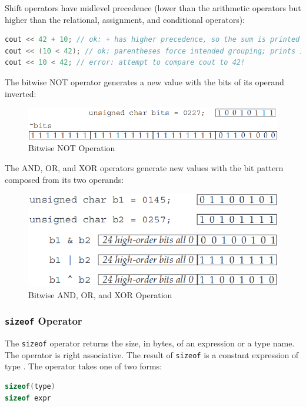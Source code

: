 Shift operators have midlevel precedence (lower than the arithmetic operators but higher than the relational, assignment, and conditional operators):
\begin{lstlisting}[language=C++]
cout << 42 + 10; // ok: + has higher precedence, so the sum is printed 
cout << (10 < 42); // ok: parentheses force intended grouping; prints 1  
cout << 10 < 42; // error: attempt to compare cout to 42!
\end{lstlisting}

The bitwise NOT operator generates a new value with the bits of its operand inverted:
\begin{figure}[H]
    \centering
    \includegraphics[width=.85\linewidth]{entries/2023/12/05/bitnot.png}
    \caption{Bitwise NOT Operation}
    \label{fig:bitnot}
\end{figure}

The AND, OR, and XOR operators generate new values with the bit pattern composed from its two operands:
\begin{figure}[H]
    \centering
    \includegraphics[width=.75\linewidth]{entries/2023/12/05/bitoth.png}
    \caption{Bitwise AND, OR, and XOR Operation}
    \label{fig:bitoth}
\end{figure}

\subsubsection{\texttt{sizeof} Operator}

The \texttt{sizeof} operator returns the size, in bytes, of an expression or a type name. The operator is right associative. The result of \texttt{sizeof} is a constant expression of type . The operator takes one of two forms:
\begin{lstlisting}[language=C++]
sizeof(type)
sizeof expr
\end{lstlisting}

